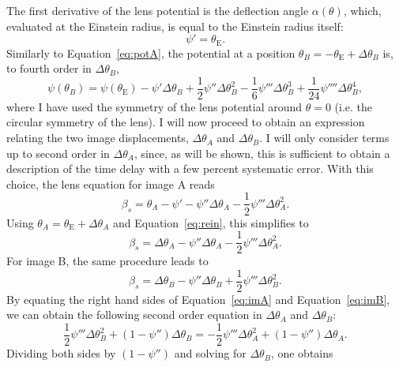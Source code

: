 \documentclass[usenatbib]{mnras}
\def\psii{\psi'}
\def\psiii{\psi''}
\def\psiiii{\psi'''}
\def\psiiv{\psi''''}
\def\tein{\theta_{\mathrm{E}}}
\def\Eref#1{Equation~\ref{#1}\xspace}
\begin{document}
The first derivative of the lens potential is the deflection angle $\alpha(\theta)$, which, evaluated at the Einstein radius, is equal to the Einstein radius itself:
\begin{equation}\label{eq:rein}
\psii = \tein.
\end{equation}
Similarly to \Eref{eq:potA}, the potential at a position $\theta_B = -\tein + \Delta\theta_B$ is, to fourth order in $\Delta\theta_B$,
\begin{equation}\label{eq:potB}
\psi(\theta_B) = \psi(\tein) - \psii \Delta\theta_B + \frac12 \psiii \Delta\theta_B^2 - \frac16 \psiiii \Delta\theta_B ^ 3 + \frac{1}{24}\psiiv\Delta\theta_B^4,
\end{equation}
where I have used the symmetry of the lens potential around $\theta = 0$ (i.e. the circular symmetry of the lens).
I will now proceed to obtain an expression relating the two image displacements, $\Delta\theta_A$ and $\Delta\theta_B$.
I will only consider terms up to second order in $\Delta\theta_A$, since, as will be shown, this is sufficient to obtain a description of the time delay with a few percent systematic error.
With this choice, the lens equation for image A reads
\begin{equation}
\beta_s = \theta_A - \psii - \psiii \Delta\theta_A - \frac12 \psiiii \Delta\theta_A^2.
\end{equation}
Using $\theta_A = \tein + \Delta\theta_A$ and \Eref{eq:rein}, this simplifies to
\begin{equation}\label{eq:imA}
\beta_s = \Delta\theta_A - \psiii \Delta\theta_A - \frac12 \psiiii \Delta\theta_A^2.
\end{equation}
For image B, the same procedure leads to
\begin{equation}\label{eq:imB}
\beta_s = \Delta\theta_B - \psiii \Delta\theta_B + \frac12 \psiiii \Delta\theta_B^2.
\end{equation}
By equating the right hand sides of \Eref{eq:imA} and \Eref{eq:imB}, we can obtain the following second order equation in $\Delta\theta_A$ and $\Delta\theta_B$:
\begin{equation}
\frac12\psiiii\Delta\theta_B^2 + (1-\psiii)\Delta\theta_B = -\frac12\psiiii\Delta\theta_A^2 + (1-\psiii)\Delta\theta_A.
\end{equation}
Dividing both sides by $(1-\psiii)$ and solving for $\Delta\theta_B$, one obtains
\end{document}
